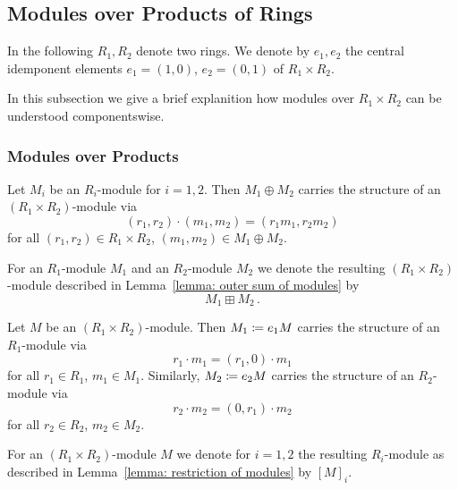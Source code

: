 \subsection{Modules over Products of Rings}
\label{appendix: modules over products of rings}


\begin{conventions}
  In the following $R_1, R_2$ denote two rings.
  We denote by $e_1, e_2$ the central idemponent elements $e_1 = (1,0)$, $e_2 = (0,1)$ of $R_1 \times R_2$.
\end{conventions}


\begin{fluff}
  In this subsection we give a brief explanition how modules over $R_1 \times R_2$ can be understood componentswise.
\end{fluff}





\subsubsection{Modules over Products}


\begin{lemma}
  \label{lemma: outer sum of modules}
  Let $M_i$ be an $R_i$-module for $i = 1, 2$.
  Then $M_1 \oplus M_2$ carries the structure of an $(R_1 \times R_2)$-module via
  \[
      (r_1, r_2) \cdot (m_1, m_2)
    = (r_1 m_1, r_2 m_2)
  \]
  for all $(r_1, r_2) \in R_1 \times R_2$, $(m_1, m_2) \in M_1 \oplus M_2$.
\end{lemma}


\begin{definition}
  For an $R_1$-module $M_1$ and an $R_2$-module $M_2$ we denote the resulting $(R_1 \times R_2)$-module described in Lemma~\ref{lemma: outer sum of modules} by
  \[
    M_1 \boxplus M_2 \,.
  \]
\end{definition}


\begin{lemma}
  \label{lemma: restriction of modules}
  Let $M$ be an $(R_1 \times R_2)$-module.
  Then $M_1 \coloneqq e_1 M$ carries the structure of an $R_1$-module via
  \[
      r_1 \cdot m_1
    = (r_1, 0) \cdot m_1
  \]
  for all $r_1 \in R_1$, $m_1 \in M_1$.
  Similarly, $M_2 \coloneqq e_2 M$ carries the structure of an $R_2$-module via
  \[
      r_2 \cdot m_2
    = (0, r_1) \cdot m_2
  \]
  for all $r_2 \in R_2$, $m_2 \in M_2$.
\end{lemma}


\begin{definition}
  For an $(R_1 \times R_2)$-module $M$ we denote for $i = 1, 2$ the resulting $R_i$-module as described in Lemma~\ref{lemma: restriction of modules} by $[M]_i$.
\end{definition}


